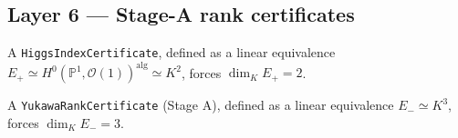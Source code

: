 \subsection*{Layer 6 --- Stage-A rank certificates}

\begin{theorem}
A \texttt{HiggsIndexCertificate}, defined as a linear equivalence
$E_+ \simeq H^0(\mathbb P^1, \mathcal O(1))^{\mathrm{alg}}
\simeq K^2$, forces $\dim_K E_+ = 2$.
\end{theorem}

\begin{theorem}
A \texttt{YukawaRankCertificate} (Stage A), defined as a linear
equivalence $E_- \simeq K^3$, forces $\dim_K E_- = 3$.
\end{theorem}

